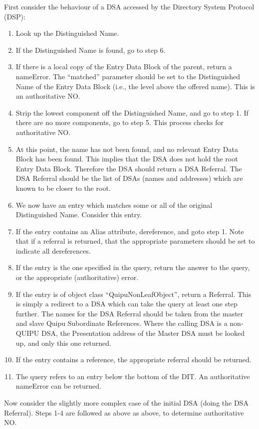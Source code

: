 First consider the behaviour of a DSA accessed by the Directory
System Protocol (DSP):

\begin {enumerate}
\item 
Look up the Distinguished Name.
\item 
If the Distinguished Name is found, go to step 6.
\item 
If there is a local copy of
the Entry Data Block of the parent,
return a nameError.
The ``matched'' parameter should be set to the Distinguished Name
of the Entry Data Block (i.e., the level above the offered name).
This is an authoritative NO.
\item 
Strip the lowest component off the Distinguished Name, and go
to step 1.
If there are no more components, go to step 5.
This process checks for authoritative NO.
\item 
At this point, the name has not been found, and no relevant
Entry Data Block has been found.
This implies that the DSA does not hold the root Entry Data
Block.
Therefore the DSA should return a DSA Referral.
The DSA Referral should be the list of DSAs (names and
addresses) which are known
to be closer to the root.
\item 
We now have an entry which matches some or all of the original
Distinguished Name.
Consider this entry.
\item 
If the entry contains an Alias attribute, dereference, and goto step 1.
Note that if a referral is returned, that the appropriate parameters should
be set to indicate all dereferences.
\item 
If the entry is the one specified in the query, return the
answer to the query, or the appropriate (authoritative) error.
\item 
If the entry is of object class ``QuipuNonLeafObject'', return a Referral.
This is simply a redirect to a DSA which can take the query at least one
step further.  The names for the DSA Referral should be taken from the
master and slave Quipu Subordinate References.  Where the calling DSA is a
non-QUIPU DSA, the Presentation address of the Master DSA must be looked up,
and only this one returned.
\item
If the entry contains a reference, the appropriate referral should be
returned.
\item 
The query refers to an entry below the bottom of the DIT.
An authoritative nameError can be returned.
\end {enumerate}

Now consider the slightly more complex case of the initial
DSA (doing the DSA Referral).
Steps 1-4 are followed as above
as above, to determine authoritative NO.

